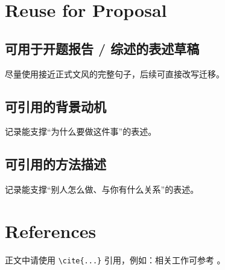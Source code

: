 \documentclass[UTF8,fontset=fandol,zihao=-4]{ctexart}
\begin{document}
\section{Reuse for Proposal}

\subsection{可用于开题报告 / 综述的表述草稿}
尽量使用接近正式文风的完整句子，后续可直接改写迁移。

\subsection{可引用的背景动机}
记录能支撑“为什么要做这件事”的表述。

\subsection{可引用的方法描述}
记录能支撑“别人怎么做、与你有什么关系”的表述。

\section{References}

正文中请使用 \verb|\cite{...}| 引用，例如：相关工作可参考 \cite{deepseekai2025r1}。

\printbibliography[heading=none]
\end{document}
